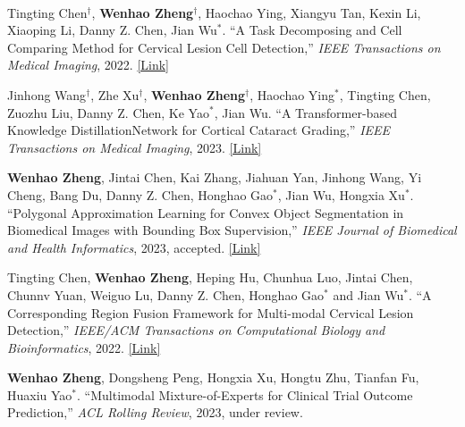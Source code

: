 
\begin{cventries}

    \cventry
    {} %
    {\ } %
    {\ } %
    {} %
    {
        \vspace{-8mm}
        \begin{cvitemize2}
            \item Tingting Chen$^\dagger$, \textbf{Wenhao Zheng$^\dagger$}, Haochao Ying, Xiangyu Tan, Kexin Li, Xiaoping Li, Danny Z. Chen, Jian Wu$^*$. ``A Task Decomposing and Cell Comparing Method for Cervical Lesion Cell Detection,'' \textit{IEEE Transactions on Medical Imaging}, 2022. \href{https://ieeexplore.ieee.org/document/9744114}{\textcolor{link}{[Link]}}
            \vspace{1mm}
            \item Jinhong Wang$^\dagger$, Zhe Xu$^\dagger$, \textbf{Wenhao Zheng$^\dagger$}, Haochao Ying$^*$, Tingting Chen, Zuozhu Liu, Danny Z. Chen, Ke Yao$^*$, Jian Wu. ``A Transformer-based Knowledge DistillationNetwork for Cortical Cataract Grading,'' \textit{IEEE Transactions on Medical Imaging}, 2023. \href{https://ieeexplore.ieee.org/abstract/document/10294274}{\textcolor{link}{[Link]}}
            \vspace{1mm}
            \item \textbf{Wenhao Zheng}, Jintai Chen, Kai Zhang, Jiahuan Yan, Jinhong Wang, Yi Cheng, Bang Du, Danny Z. Chen, Honghao Gao$^*$, Jian Wu, Hongxia Xu$^*$. ``Polygonal Approximation Learning for Convex Object Segmentation in Biomedical Images with Bounding Box Supervision,'' \textit{IEEE Journal of Biomedical and Health Informatics}, 2023, accepted. \href{https://ieeexplore.ieee.org/document/10354298}{\textcolor{link}{[Link]}}
            \vspace{1mm}
            \item Tingting Chen, \textbf{Wenhao Zheng}, Heping Hu, Chunhua Luo, Jintai Chen, Chunnv Yuan, Weiguo Lu, Danny Z. Chen, Honghao Gao$^*$ and Jian Wu$^*$. ``A Corresponding Region Fusion Framework for Multi-modal Cervical Lesion Detection,'' \textit{IEEE/ACM Transactions on Computational Biology and Bioinformatics}, 2022. \href{https://ieeexplore.ieee.org/document/9784879}{\textcolor{link}{[Link]}}
            \vspace{1mm}
            \item \textbf{Wenhao Zheng}, Dongsheng Peng, Hongxia Xu, Hongtu Zhu, Tianfan Fu, Huaxiu Yao$^*$. ``Multimodal Mixture-of-Experts for Clinical Trial Outcome Prediction,'' \textit{ACL Rolling Review}, 2023, under review.

\end{cvitemize2}}
\end{cventries}
